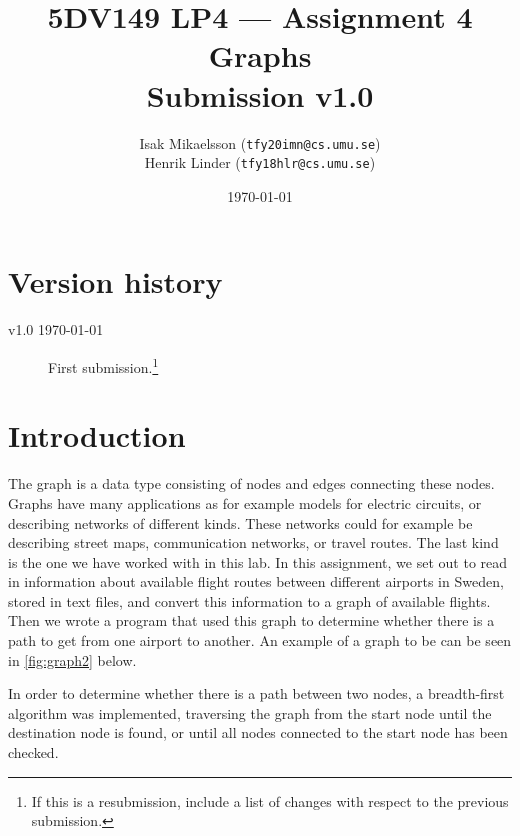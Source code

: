 \documentclass{article}
\author{Isak Mikaelsson (\texttt{tfy20imn@cs.umu.se})\\
Henrik Linder (\texttt{tfy18hlr@cs.umu.se})
}
\date{\today}
\title{5DV149 LP4 --- Assignment 4\\\medskip
\large Graphs\\
Submission v1.0}
\begin{document}
\maketitle
\clearpage \tableofcontents \clearpage\addtocounter{section}{-1}
\section{Version history}
\label{sec:history}
\begin{description}
\item[{v1.0 \today}] First submission.\footnote{If this is a resubmission, 
include a list of changes with
respect to the previous submission.}
\end{description}
\section{Introduction}
\label{sec:intro}
The graph is a data type consisting of nodes and edges connecting these nodes. Graphs have many applications as for example models for electric circuits, or describing networks of different kinds. These networks could for example be describing street maps, communication networks, or travel routes. The last kind is the one we have worked with in this lab. 
In this assignment, we set out to read in information about available flight routes between different airports in Sweden, stored in text files, and convert this information to a graph of available flights. Then we wrote a program that used this graph to determine whether there is a path to get from one airport to another. 
An example of a graph to be can be seen in \ref{fig:graph2} below. 

In order to determine whether there is a path between two nodes, a breadth-first algorithm was implemented, traversing the graph from the start node until the destination node is found, or until all nodes connected to the start node has been checked. 
\end{document}
